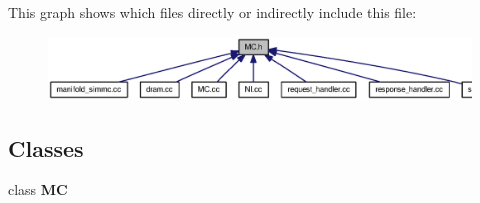 This graph shows which files directly or indirectly include this file:\nopagebreak
\begin{figure}[H]
\begin{center}
\leavevmode
\includegraphics[width=318pt]{MC_8h__dep__incl}
\end{center}
\end{figure}
\subsection*{Classes}
\begin{CompactItemize}
\item 
class {\bf MC}
\end{CompactItemize}
